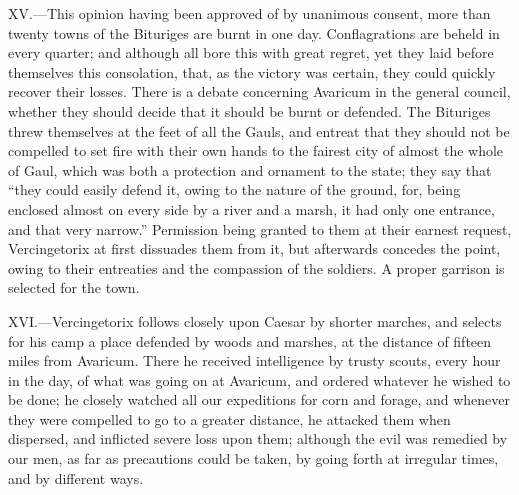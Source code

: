 XV.—This opinion having been approved of by unanimous consent, more
than twenty towns of the Bituriges are burnt in one day. Conflagrations
are beheld in every quarter; and although all bore this with great
regret, yet they laid before themselves this consolation, that, as the
victory was certain, they could quickly recover their losses. There is a
debate concerning Avaricum in the general council, whether they should
decide that it should be burnt or defended. The Bituriges threw
themselves at the feet of all the Gauls, and entreat that they should
not be compelled to set fire with their own hands to the fairest city of
almost the whole of Gaul, which was both a protection and ornament to
the state; they say that ``they could easily defend it, owing to the
nature of the ground, for, being enclosed almost on every side by a
river and a marsh, it had only one entrance, and that very narrow.''
Permission being granted to them at their earnest request, Vercingetorix
at first dissuades them from it, but afterwards concedes the point,
owing to their entreaties and the compassion of the soldiers. A proper
garrison is selected for the town.

XVI.—Vercingetorix follows closely upon Caesar by shorter marches, and
selects for his camp a place defended by woods and marshes, at the
distance of fifteen miles from Avaricum. There he received intelligence
by trusty scouts, every hour in the day, of what was going on at
Avaricum, and ordered whatever he wished to be done; he closely watched
all our expeditions for corn and forage, and whenever they were
compelled to go to a greater distance, he attacked them when dispersed,
and inflicted severe loss upon them; although the evil was remedied by
our men, as far as precautions could be taken, by going forth at
irregular times, and by different ways.

